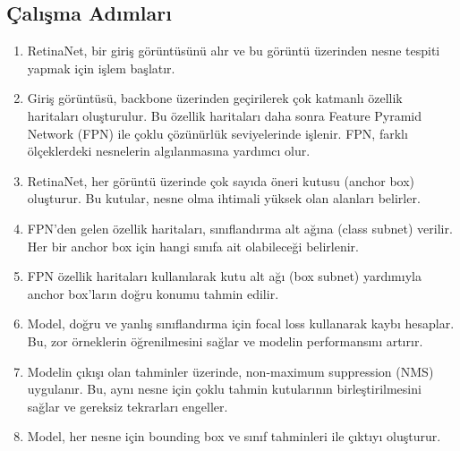 \subsection{Çalışma Adımları}

\begin{enumerate}
    \item RetinaNet, bir giriş görüntüsünü alır ve bu görüntü üzerinden nesne tespiti yapmak için işlem başlatır.
    \item Giriş görüntüsü, backbone üzerinden geçirilerek çok katmanlı özellik haritaları oluşturulur. Bu özellik haritaları daha sonra Feature Pyramid Network (FPN) ile çoklu çözünürlük seviyelerinde işlenir. FPN, farklı ölçeklerdeki nesnelerin algılanmasına yardımcı olur.
    \item RetinaNet, her görüntü üzerinde çok sayıda öneri kutusu (anchor box) oluşturur. Bu kutular, nesne olma ihtimali yüksek olan alanları belirler.
    \item FPN’den gelen özellik haritaları, sınıflandırma alt ağına (class subnet) verilir. Her bir anchor box için hangi sınıfa ait olabileceği belirlenir.
    \item FPN özellik haritaları kullanılarak kutu alt ağı (box subnet) yardımıyla anchor box’ların doğru konumu tahmin edilir.
    \item Model, doğru ve yanlış sınıflandırma için focal loss kullanarak kaybı hesaplar. Bu, zor örneklerin öğrenilmesini sağlar ve modelin performansını artırır.
    \item Modelin çıkışı olan tahminler üzerinde, non-maximum suppression (NMS) uygulanır. Bu, aynı nesne için çoklu tahmin kutularının birleştirilmesini sağlar ve gereksiz tekrarları engeller.
    \item Model, her nesne için bounding box ve sınıf tahminleri ile çıktıyı oluşturur.
\end{enumerate}

\newpage